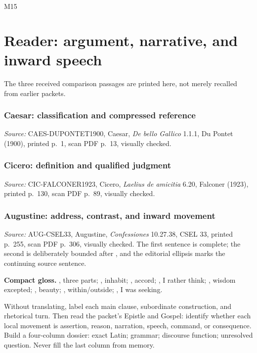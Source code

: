 \begin{courseunit}{M15}
\chapter{Reader: argument, narrative, and inward speech}

The three received comparison passages are printed here, not merely recalled
from earlier packets.

\subsection*{Caesar: classification and compressed reference}
\ReaderCaesarGallia

\emph{Source:} CAES-DUPONTET1900, Caesar, \textit{De bello Gallico} 1.1.1,
Du Pontet (1900), printed p.~1, scan PDF p.~13, visually checked.

\subsection*{Cicero: definition and qualified judgment}
\ReaderCiceroFriendship

\emph{Source:} CIC-FALCONER1923, Cicero, \textit{Laelius de amicitia} 6.20,
Falconer (1923), printed p.~130, scan PDF p.~89, visually checked.

\subsection*{Augustine: address, contrast, and inward movement}
\ReaderAugustineLate

\emph{Source:} AUG-CSEL33, Augustine, \textit{Confessiones} 10.27.38, CSEL
33, printed p.~255, scan PDF p.~306, visually checked.  The first sentence is
complete; the second is deliberately bounded after , and the
editorial ellipsis marks the continuing source sentence.

\textbf{Compact gloss.} , three parts;
, inhabit; , accord; , I
rather think; , wisdom excepted;
, beauty; , within/outside;
, I was seeking.

Without translating, label each main clause, subordinate construction, and
rhetorical turn.  Then read the packet's Epistle and Gospel: identify whether
each local movement is assertion, reason, narration, speech, command, or
consequence.  Build a four-column dossier: exact Latin; grammar; discourse
function; unresolved question.  Never fill the last column from memory.


\end{courseunit}

